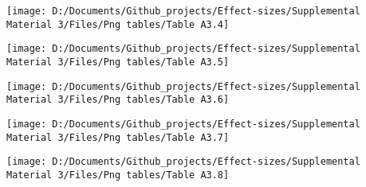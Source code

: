 \documentclass[
  man]{apa6}
\begin{document}
\begin{sidewaysfigure}

{\centering \texttt{[image: D:/Documents/Github\_projects/Effect-sizes/Supplemental Material 3/Files/Png tables/Table A3.4]} 

}

\end{sidewaysfigure}

\begin{sidewaysfigure}

{\centering \texttt{[image: D:/Documents/Github\_projects/Effect-sizes/Supplemental Material 3/Files/Png tables/Table A3.5]} 

}

\end{sidewaysfigure}

\begin{sidewaysfigure}

{\centering \texttt{[image: D:/Documents/Github\_projects/Effect-sizes/Supplemental Material 3/Files/Png tables/Table A3.6]} 

}

\end{sidewaysfigure}

\begin{sidewaysfigure}

{\centering \texttt{[image: D:/Documents/Github\_projects/Effect-sizes/Supplemental Material 3/Files/Png tables/Table A3.7]} 

}

\end{sidewaysfigure}

\begin{sidewaysfigure}

{\centering \texttt{[image: D:/Documents/Github\_projects/Effect-sizes/Supplemental Material 3/Files/Png tables/Table A3.8]} 

}

\end{sidewaysfigure}
\end{document}
